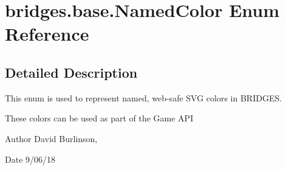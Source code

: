\hypertarget{enumbridges_1_1base_1_1_named_color}{}\section{bridges.\+base.\+Named\+Color Enum Reference}
\label{enumbridges_1_1base_1_1_named_color}


\subsection{Detailed Description}
This enum is used to represent named, web-\/safe S\+VG colors in B\+R\+I\+D\+G\+ES. 

These colors can be used as part of the Game A\+PI

\begin{DoxyAuthor}{Author}
David Burlinson, 
\end{DoxyAuthor}
\begin{DoxyDate}{Date}
9/06/18 
\end{DoxyDate}
